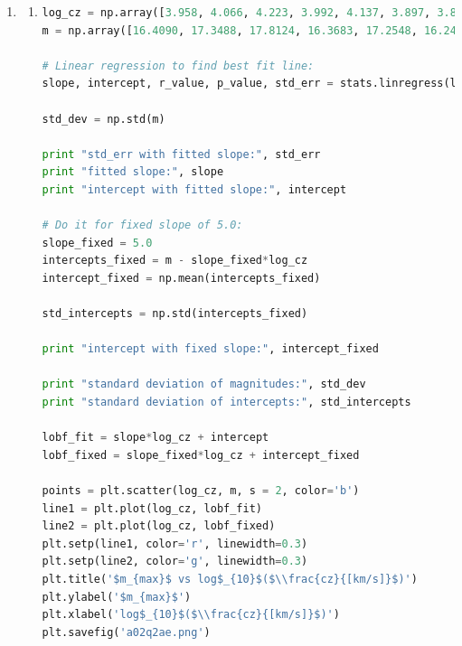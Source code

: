 \documentclass[10pt,letterpaper]{article}
\begin{document}
\begin{enumerate}
\begin{enumerate}
as in e), \begin{equation}\nonumber
\begin{split}
R & = \sqrt[3]{\frac{112.7\times1.33\times10^{11}}{2.7192 \times10^{13}}\left(\frac{3}{4\pi}\right)}\\
 & = \textbf{0.509 Mpc}\\
\end{split}
\end{equation}


\end{enumerate}

\item 
\begin{enumerate}

\item

\begin{lstlisting}[language=Python]
log_cz = np.array([3.958, 4.066, 4.223, 3.992, 4.137, 3.897, 3.891, 4.481, 3.774, 4.240, 3.736, 4.326])
m = np.array([16.4090, 17.3488, 17.8124, 16.3683, 17.2548, 16.2426, 16.2164, 19.0955, 15.4026, 17.7777, 15.4329, 18.4524])

# Linear regression to find best fit line:
slope, intercept, r_value, p_value, std_err = stats.linregress(log_cz, m)

std_dev = np.std(m)

print "std_err with fitted slope:", std_err
print "fitted slope:", slope
print "intercept with fitted slope:", intercept

# Do it for fixed slope of 5.0:
slope_fixed = 5.0
intercepts_fixed = m - slope_fixed*log_cz
intercept_fixed = np.mean(intercepts_fixed)

std_intercepts = np.std(intercepts_fixed)

print "intercept with fixed slope:", intercept_fixed

print "standard deviation of magnitudes:", std_dev
print "standard deviation of intercepts:", std_intercepts

lobf_fit = slope*log_cz + intercept
lobf_fixed = slope_fixed*log_cz + intercept_fixed

points = plt.scatter(log_cz, m, s = 2, color='b')
line1 = plt.plot(log_cz, lobf_fit)
line2 = plt.plot(log_cz, lobf_fixed)
plt.setp(line1, color='r', linewidth=0.3)
plt.setp(line2, color='g', linewidth=0.3)
plt.title('$m_{max}$ vs log$_{10}$($\\frac{cz}{[km/s]}$)')
plt.ylabel('$m_{max}$')
plt.xlabel('log$_{10}$($\\frac{cz}{[km/s]}$)')
plt.savefig('a02q2ae.png')
\end{lstlisting}


\end{enumerate}
\end{enumerate}
\end{document}
